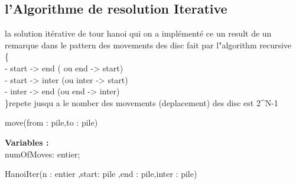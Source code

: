 \subsection{l'Algorithme de resolution Iterative}
la solution itérative de tour hanoi qui on a implémenté ce un result de un remarque dans le pattern des movements des disc fait par l"algorithm recursive\\
\{\\
-  start -> end ( ou end -> start)\\
-  start -> inter (ou inter -> start)\\
-  inter -> end (ou end -> inter)\\
\}repete jusqu a le nomber des movements (deplacement) des disc est 2^N-1 
\\
\par
\begin{function}[H]
    \caption{move(from : pile,to : pile)}
\end{function}
\begin{function}[H]
\textbf{Variables :}\\
    numOfMoves: entier;\\
    \caption{HanoiIter(n : entier ,start: pile ,end : pile,inter : pile)}
\end{function}
